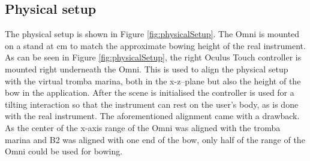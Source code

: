 \documentclass[dvipsnames, pdftex]{article}
\begin{document}

\subsection{Physical setup}\label{subsec:physicalSetup}
The physical setup is shown in Figure \ref{fig:physicalSetup}. The Omni is mounted on a stand at  cm to match the approximate bowing height of the real instrument. As can be seen in Figure \ref{fig:physicalSetup}, the right Oculus Touch controller is mounted right underneath the Omni. This is used to align the physical setup with the virtual tromba marina, both in the x-z--plane but also the height of the bow in the application. After the scene is initialised the controller is used for a tilting interaction so that the instrument can rest on the user's body, as is done with the real instrument. The aforementioned alignment came with a drawback. As the center of the x-axis range of the Omni was aligned with the tromba marina and B2 was aligned with one end of the bow, only half of the range of the Omni could be used for bowing.
\end{document}
